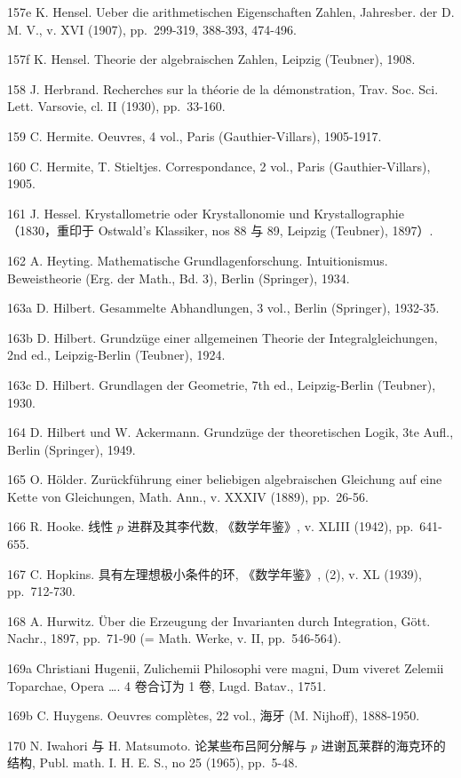 157e K. Hensel. Ueber die arithmetischen Eigenschaften Zahlen, Jahresber. der D. M. V., v. XVI (1907), pp.~299-319, 388-393, 474-496.

157f K. Hensel. Theorie der algebraischen Zahlen, Leipzig (Teubner), 1908.

158 J. Herbrand. Recherches sur la théorie de la démonstration, Trav. Soc. Sci. Lett. Varsovie, cl. II (1930), pp.~33-160.

159 C. Hermite. Oeuvres, 4 vol., Paris (Gauthier-Villars), 1905-1917.

160 C. Hermite, T. Stieltjes. Correspondance, 2 vol., Paris (Gauthier-Villars), 1905.

161 J. Hessel. Krystallometrie oder Krystallonomie und Krystallographie （1830，重印于 Ostwald's Klassiker, nos 88 与 89, Leipzig (Teubner), 1897）.

162 A. Heyting. Mathematische Grundlagenforschung. Intuitionismus. Beweistheorie (Erg. der Math., Bd. 3), Berlin (Springer), 1934.

163a D. Hilbert. Gesammelte Abhandlungen, 3 vol., Berlin (Springer), 1932-35.

163b D. Hilbert. Grundzüge einer allgemeinen Theorie der Integralgleichungen, 2nd ed., Leipzig-Berlin (Teubner), 1924.

163c D. Hilbert. Grundlagen der Geometrie, 7th ed., Leipzig-Berlin (Teubner), 1930.

164 D. Hilbert und W. Ackermann. Grundzüge der theoretischen Logik, 3te Aufl., Berlin (Springer), 1949.

165 O. Hölder. Zurückführung einer beliebigen algebraischen Gleichung auf eine Kette von Gleichungen, Math. Ann., v. XXXIV (1889), pp.~26-56.

166 R. Hooke. 线性 \(p\) 进群及其李代数, 《数学年鉴》, v. XLIII (1942), pp.~641-655.

167 C. Hopkins. 具有左理想极小条件的环, 《数学年鉴》, (2), v. XL (1939), pp.~712-730.

168 A. Hurwitz. Über die Erzeugung der Invarianten durch Integration, Gött. Nachr., 1897, pp.~71-90 (= Math. Werke, v. II, pp.~546-564).

169a Christiani Hugenii, Zulichemii Philosophi vere magni, Dum viveret Zelemii Toparchae, Opera \ldots. 4 卷合订为 1 卷, Lugd. Batav., 1751.

169b C. Huygens. Oeuvres complètes, 22 vol., 海牙 (M. Nijhoff), 1888-1950.

170 N. Iwahori 与 H. Matsumoto. 论某些布吕阿分解与 \(p\) 进谢瓦莱群的海克环的结构, Publ. math. I. H. E. S., no 25 (1965), pp.~5-48.

